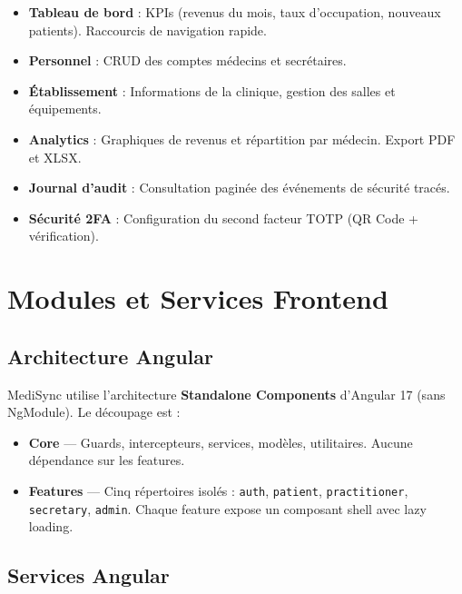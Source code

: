 \documentclass[12pt,a4paper]{report}
\begin{document}
\begin{itemize}[leftmargin=*,itemsep=3pt]
  \item \textbf{Tableau de bord} : KPIs (revenus du mois, taux d'occupation, nouveaux patients). Raccourcis de navigation rapide.
  \item \textbf{Personnel} : CRUD des comptes médecins et secrétaires.
  \item \textbf{Établissement} : Informations de la clinique, gestion des salles et équipements.
  \item \textbf{Analytics} : Graphiques de revenus et répartition par médecin. Export PDF et XLSX.
  \item \textbf{Journal d'audit} : Consultation paginée des événements de sécurité tracés.
  \item \textbf{Sécurité 2FA} : Configuration du second facteur TOTP (QR Code + vérification).
\end{itemize}

\chapter{Modules et Services Frontend}

\section{Architecture Angular}

MediSync utilise l'architecture \textbf{Standalone Components} d'Angular 17 (sans NgModule). Le découpage est :

\begin{itemize}[leftmargin=*,itemsep=2pt]
  \item \textbf{Core} — Guards, intercepteurs, services, modèles, utilitaires. Aucune dépendance sur les features.
  \item \textbf{Features} — Cinq répertoires isolés : \texttt{auth}, \texttt{patient}, \texttt{practitioner}, \texttt{secretary}, \texttt{admin}. Chaque feature expose un composant shell avec lazy loading.
\end{itemize}

\section{Services Angular}
\end{document}
